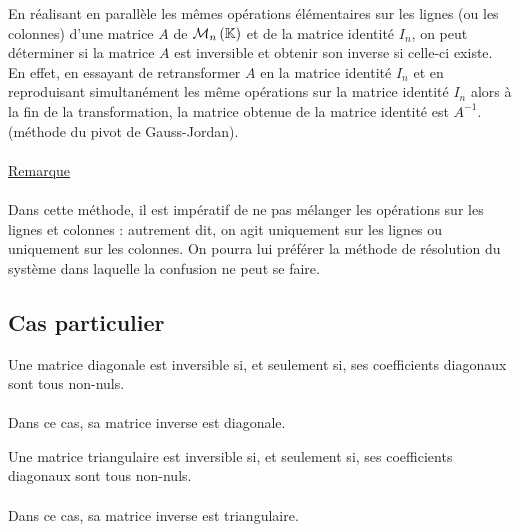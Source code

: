 \begin{defprop}
    En réalisant en parallèle les mêmes opérations élémentaires sur les lignes (ou les colonnes) d’une matrice \(A\) de \(\mathcal{M}_n\left(\mathbb{K}\right)\) et de la matrice identité \(I_n\), on peut déterminer si la matrice \(A\) est inversible et obtenir son inverse si celle-ci existe. En effet, en essayant de retransformer \(A\) en la matrice identité \(I_n\) et en reproduisant simultanément les même opérations sur la matrice identité \(I_n\) alors à la fin de la transformation, la matrice obtenue de la matrice identité est \(A^{-1}\). (méthode du pivot de Gauss-Jordan).\\~\\
    \underline{Remarque}\\~\\
    Dans cette méthode, il est impératif de ne pas mélanger les opérations sur les lignes et colonnes : autrement dit, on agit uniquement sur les lignes ou uniquement sur les colonnes. On pourra lui préférer la méthode de résolution du système dans laquelle la confusion ne peut se faire.
\end{defprop}

\subsection{Cas particulier}
\begin{defprop}
    Une matrice diagonale est inversible si, et seulement si, ses coefficients diagonaux sont tous non-nuls.\\~\\
    Dans ce cas, sa matrice inverse est diagonale.
\end{defprop}

\begin{defprop}
    Une matrice triangulaire est inversible si, et seulement si, ses coefficients diagonaux sont tous non-nuls.\\~\\
    Dans ce cas, sa matrice inverse est triangulaire.
\end{defprop}